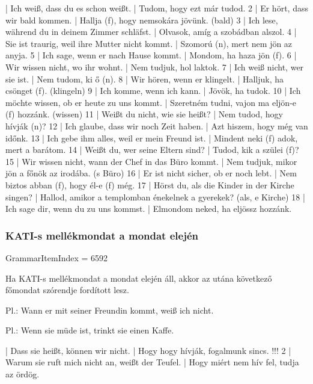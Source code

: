 \documentclass{article}
\newenvironment{desc}{\verbatim}{\endverbatim}
\newenvironment{exmp}{\verbatim}{\endverbatim}
\begin{document}
\begin{exmp}
1 | Ich weiß, dass du es schon weißt. | Tudom, hogy ezt már tudod.
2 | Er hört, dass wir bald kommen. | Hallja (f), hogy nemsokára jövünk. (bald)
3 | Ich lese, während du in deinem Zimmer schläfst. | Olvasok, amíg a szobádban alszol.
4 | Sie ist traurig, weil ihre Mutter nicht kommt. | Szomorú (n), mert nem jön az anyja.
5 | Ich sage, wenn er nach Hause kommt. | Mondom, ha haza jön (f).
6 | Wir wissen nicht, wo ihr wohnt. | Nem tudjuk, hol laktok.
7 | Ich weiß nicht, wer sie ist. | Nem tudom, ki ő (n).
8 | Wir hören, wenn er klingelt. | Halljuk, ha csönget (f). (klingeln)
9 | Ich komme, wenn ich kann. | Jövök, ha tudok.
10 | Ich möchte wissen, ob er heute zu uns kommt. | Szeretném tudni, vajon ma eljön-e (f) hozzánk. (wissen)
11 | Weißt du nicht, wie sie heißt? | Nem tudod, hogy hívják (n)?
12 | Ich glaube, dass wir noch Zeit haben. | Azt hiszem, hogy még van időnk.
13 | Ich gebe ihm alles, weil er mein Freund ist. | Mindent neki (f) adok, mert a barátom.
14 | Weißt du, wer seine Eltern sind? | Tudod, kik a szülei (f)?
15 | Wir wissen nicht, wann der Chef in das Büro kommt. | Nem tudjuk, mikor jön a főnök az irodába. (s Büro)
16 | Er ist nicht sicher, ob er noch lebt. | Nem biztos abban (f), hogy él-e (f) még.
17 | Hörst du, als die Kinder in der Kirche singen? | Hallod, amikor a templomban énekelnek a gyerekek? (als, e Kirche)
18 | Ich sage dir, wenn du zu uns kommst. | Elmondom neked, ha eljössz hozzánk.
\end{exmp}

\subsubsection{KATI-s mellékmondat a mondat elején}

GrammarItemIndex = 6592

\begin{desc}
Ha KATI-s mellékmondat a mondat elején áll, akkor az utána következő főmondat szórendje fordított lesz.

Pl.: Wann er mit seiner Freundin kommt, weiß ich nicht.

Pl.: Wenn sie müde ist, trinkt sie einen Kaffe.
\end{desc}

\begin{exmp}
1 | Dass sie heißt, können wir nicht. | Hogy hogy hívják, fogalmunk sincs. !!!
2 | Warum sie ruft mich nicht an, weißt der Teufel. | Hogy miért nem hív fel, tudja az ördög.
\end{exmp}
\end{document}
